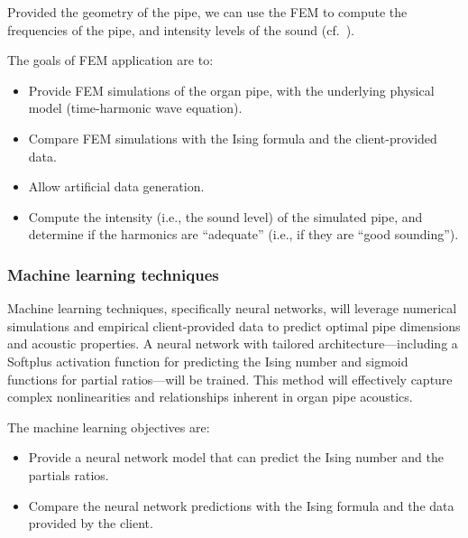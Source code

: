 \documentclass{psu-plan}
\begin{document}
Provided the geometry of the pipe, we can use the FEM to compute the frequencies
of the pipe, and intensity levels of the sound
(cf.~\autocite[Figure 1]{2009RucAugFia-1}).

The goals of FEM application are to:
\begin{itemize}
    \item Provide FEM simulations of the organ pipe, with the underlying
        physical model (time-harmonic wave equation).
    \item Compare FEM simulations with the Ising formula and the client-provided data.
    \item Allow artificial data generation.
    \item Compute the intensity (i.e., the sound level) of the simulated pipe,
        and determine if the harmonics are ``adequate'' (i.e., if they are
        ``good sounding'').
\end{itemize}


\subsubsection{Machine learning techniques}



Machine learning techniques, specifically neural networks, will leverage numerical simulations and empirical 
client-provided data to predict optimal pipe dimensions and acoustic properties. 
A neural network with tailored architecture—including a Softplus activation function for predicting the 
Ising number and sigmoid functions for partial ratios—will be trained. 
This method will effectively capture complex nonlinearities and relationships inherent in organ pipe acoustics.

The machine learning objectives are:
\begin{itemize}
    \item Provide a neural network model that can predict the Ising number and
        the partials ratios.
    \item Compare the neural network predictions with the Ising formula and the
        data provided by the client.
\end{itemize}
\end{document}
